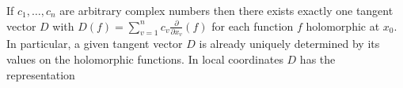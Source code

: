 If $c_1, \ldots, c_n$ are arbitrary complex numbers then there exists exactly one tangent vector $D$ with $D(f) = \sum_{v=1}^{n} c_v \frac{\partial}{\partial x_v}(f)$ for each function $f$ holomorphic at $x_0$. In particular, a given tangent vector $D$ is already uniquely determined by its values on the holomorphic functions. In local coordinates $D$ has the representation
